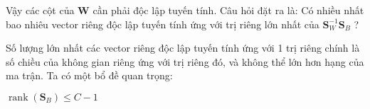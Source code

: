 Vậy các cột của $\boldsymbol{W}$ cần phải độc lập tuyến tính. Câu hỏi đặt ra là: Có nhiều nhất bao nhiêu vector riêng độc lập tuyến tính ứng với trị riêng lớn nhất của $\boldsymbol{S}_W^{-1} \boldsymbol{S}_B$ ?

Số lượng lớn nhất các vector riêng độc lập tuyến tính ứng với 1 trị riêng chính là số chiều của không gian riêng ứng với trị riêng đó, và không thể lớn hơn hạng của ma trận.
Ta có một bổ đề quan trọng:
\begin{lemma}
	$\operatorname{rank}\left(\boldsymbol{S}_B\right) \leq C-1$
\end{lemma}